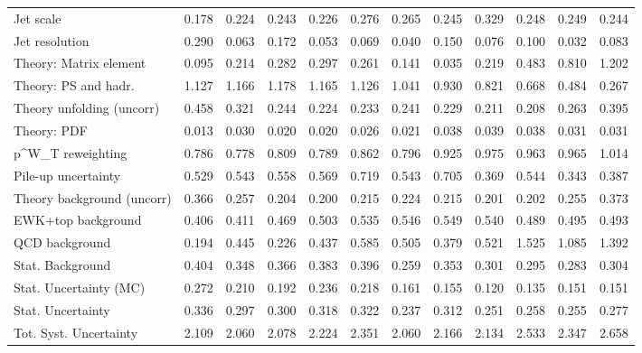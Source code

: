 \begin{tabular}{l|p{0.6cm}p{0.6cm}p{0.6cm}p{0.6cm}p{0.6cm}p{0.6cm}p{0.6cm}p{0.6cm}p{0.6cm}p{0.6cm}p{0.6cm}}
Jet scale                                & 0.178 & 0.224 & 0.243 & 0.226 & 0.276 & 0.265 & 0.245 & 0.329 & 0.248 & 0.249 & 0.244 \\
Jet resolution                           & 0.290 & 0.063 & 0.172 & 0.053 & 0.069 & 0.040 & 0.150 & 0.076 & 0.100 & 0.032 & 0.083 \\
Theory: Matrix element                   & 0.095 & 0.214 & 0.282 & 0.297 & 0.261 & 0.141 & 0.035 & 0.219 & 0.483 & 0.810 & 1.202 \\
Theory: PS and hadr.                     & 1.127 & 1.166 & 1.178 & 1.165 & 1.126 & 1.041 & 0.930 & 0.821 & 0.668 & 0.484 & 0.267 \\
Theory unfolding (uncorr)                & 0.458 & 0.321 & 0.244 & 0.224 & 0.233 & 0.241 & 0.229 & 0.211 & 0.208 & 0.263 & 0.395 \\
Theory: PDF                              & 0.013 & 0.030 & 0.020 & 0.020 & 0.026 & 0.021 & 0.038 & 0.039 & 0.038 & 0.031 & 0.031 \\
p^{W}_{T} reweighting                    & 0.786 & 0.778 & 0.809 & 0.789 & 0.862 & 0.796 & 0.925 & 0.975 & 0.963 & 0.965 & 1.014 \\
Pile-up uncertainty                      & 0.529 & 0.543 & 0.558 & 0.569 & 0.719 & 0.543 & 0.705 & 0.369 & 0.544 & 0.343 & 0.387 \\
Theory background (uncorr)               & 0.366 & 0.257 & 0.204 & 0.200 & 0.215 & 0.224 & 0.215 & 0.201 & 0.202 & 0.255 & 0.373 \\
EWK+top background                       & 0.406 & 0.411 & 0.469 & 0.503 & 0.535 & 0.546 & 0.549 & 0.540 & 0.489 & 0.495 & 0.493 \\
QCD background                           & 0.194 & 0.445 & 0.226 & 0.437 & 0.585 & 0.505 & 0.379 & 0.521 & 1.525 & 1.085 & 1.392 \\
Stat. Background                         & 0.404 & 0.348 & 0.366 & 0.383 & 0.396 & 0.259 & 0.353 & 0.301 & 0.295 & 0.283 & 0.304 \\
Stat. Uncertainty (MC)                   & 0.272 & 0.210 & 0.192 & 0.236 & 0.218 & 0.161 & 0.155 & 0.120 & 0.135 & 0.151 & 0.151 \\
\hline
Stat. Uncertainty                        & 0.336 & 0.297 & 0.300 & 0.318 & 0.322 & 0.237 & 0.312 & 0.251 & 0.258 & 0.255 & 0.277 \\
\hline
Tot. Syst. Uncertainty                   & 2.109 & 2.060 & 2.078 & 2.224 & 2.351 & 2.060 & 2.166 & 2.134 & 2.533 & 2.347 & 2.658 \\
\hline
\end{tabular}
